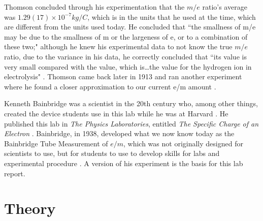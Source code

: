 \documentclass[aps,prl,10pt,twocolumn,floatfix]{revtex4-2}
\begin{document}
Thomson concluded through his experimentation that the $m/e$ ratio's average was  $1.29(17)\!\times\!10^{-7} kg/C$, which is in the units that he used at the time, which are different from the units used today.
He concluded that ``the smallness of m/e may be due to the smallness of m or the largeness of e, or to a combination
of these two;"
although he knew his experimental data to not know the true $m/e$ ratio, due to the variance in his data, he correctly concluded that ``its value is very small compared with the value, which is\ldots the value for the hydrogen ion in electrolysis" \cite{CathodeRays}.
Thomson came back later in 1913 and ran another experiment where he found a closer approximation to our current e/m amount \cite{Wiki}.

Kenneth Bainbridge was a scientist in the 20th century who, among other things, created the device students use in this lab while he was at Harvard \cite{Bainbridge}.
He published this lab in \textit{The Physics Laboratories}, entitled \textit{The Specific Charge of an Electron} \cite{Bainbridge}.
Bainbridge, in 1938, developed what we now know today as the Bainbridge Tube Measurement of $e/m$, which was not originally designed for scientists to use, but for students to use to develop skills for labs and experimental procedure \cite{Bainbridge}.
A version of his experiment is the basis for this lab report.


\section{Theory}\label{Theory}
\end{document}
